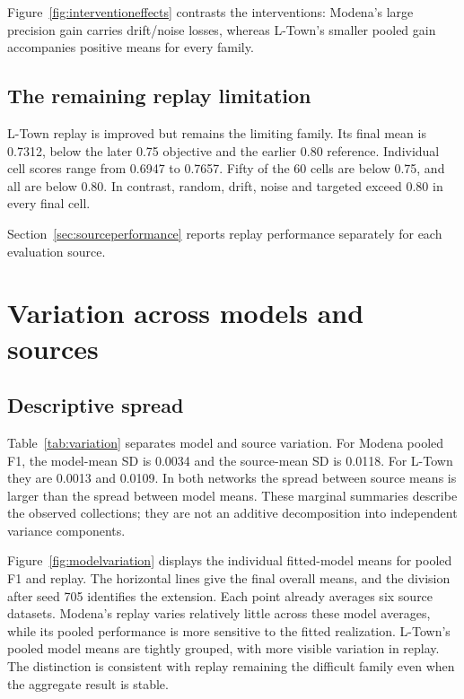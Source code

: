 
Figure~\ref{fig:interventioneffects} contrasts the interventions: Modena's large precision gain carries drift/noise losses, whereas L-Town's smaller pooled gain accompanies positive means for every family.

\subsection{The remaining replay limitation}
L-Town replay is improved but remains the limiting family. Its final mean is 0.7312, below the later 0.75 objective and the earlier 0.80 reference. Individual cell scores range from 0.6947 to 0.7657. Fifty of the 60 cells are below 0.75, and all are below 0.80. In contrast, random, drift, noise and targeted exceed 0.80 in every final cell.

Section~\ref{sec:sourceperformance} reports replay performance separately for each evaluation source.

\FloatBarrier
\section{Variation across models and sources}
\subsection{Descriptive spread}
Table~\ref{tab:variation} separates model and source variation. For Modena pooled F1, the model-mean SD is 0.0034 and the source-mean SD is 0.0118. For L-Town they are 0.0013 and 0.0109. In both networks the spread between source means is larger than the spread between model means. These marginal summaries describe the observed collections; they are not an additive decomposition into independent variance components.



Figure~\ref{fig:modelvariation} displays the individual fitted-model means for pooled F1 and replay. The horizontal lines give the final overall means, and the division after seed 705 identifies the extension. Each point already averages six source datasets. Modena's replay varies relatively little across these model averages, while its pooled performance is more sensitive to the fitted realization. L-Town's pooled model means are tightly grouped, with more visible variation in replay. The distinction is consistent with replay remaining the difficult family even when the aggregate result is stable.

